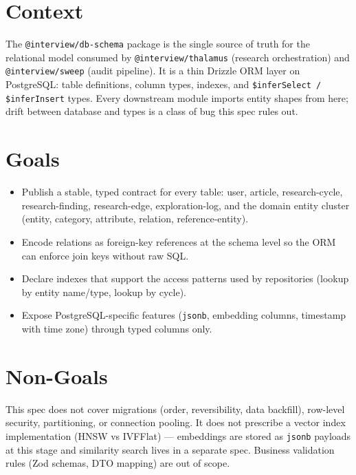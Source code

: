 



\makespecheader

\section{Context}
The \texttt{@interview/db-schema} package is the single source of truth for the
relational model consumed by \texttt{@interview/thalamus} (research orchestration)
and \texttt{@interview/sweep} (audit pipeline). It is a thin Drizzle ORM layer on
PostgreSQL: table definitions, column types, indexes, and \texttt{\$inferSelect /
\$inferInsert} types. Every downstream module imports entity shapes from here;
drift between database and types is a class of bug this spec rules out.

\section{Goals}
\begin{itemize}[leftmargin=1.2em]
  \item Publish a stable, typed contract for every table: user, article,
        research-cycle, research-finding, research-edge, exploration-log, and
        the domain entity cluster (entity, category, attribute, relation,
        reference-entity).
  \item Encode relations as foreign-key references at the schema level so the
        ORM can enforce join keys without raw SQL.
  \item Declare indexes that support the access patterns used by repositories
        (lookup by entity name/type, lookup by cycle).
  \item Expose PostgreSQL-specific features (\texttt{jsonb}, embedding columns,
        timestamp with time zone) through typed columns only.
\end{itemize}

\section{Non-Goals}
\begin{nongoal}
This spec does not cover migrations (order, reversibility, data backfill),
row-level security, partitioning, or connection pooling. It does not prescribe
a vector index implementation (HNSW vs IVFFlat) --- embeddings are stored as
\texttt{jsonb} payloads at this stage and similarity search lives in a separate
spec. Business validation rules (Zod schemas, DTO mapping) are out of scope.
\end{nongoal}

